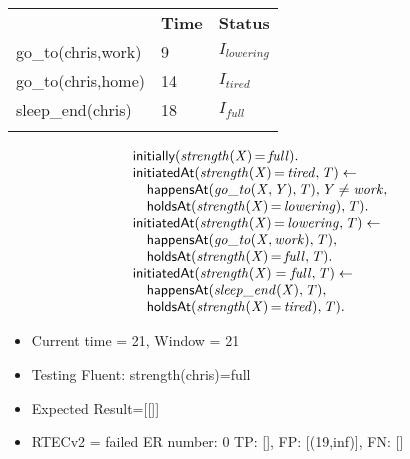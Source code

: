 \documentclass[8pt]{beamer}
\DeclareMathOperator{\val}{=}  %
\def \patsize {}
\def\happensAt{\textsf{\patsize happensAt}}
\def\initially{\textsf{\patsize initially}}
\def\holdsAt{\textsf{\patsize holdsAt}}
\def\initiatedAt{\textsf{\patsize initiatedAt}}
\newenvironment{mysplit}%
  {\arraycolsep 0pt \begin{array}{l}}%
  {\end{array}}
\begin{document}
\begin{frame}
\begin{minipage}{0.4\linewidth}
\begin{table}[t!]
\begin{center}
                \begin{tabular}{lll}
                    \hline\noalign{\smallskip}
                    \multicolumn{1}{l}{\textbf{Event}} & \multicolumn{1}{c}{\textbf{Time}} & \multicolumn{1}{c}{\textbf{Status}} \\
                    go\_to(chris,work)& 9 & $I_{lowering}$\\
                    go\_to(chris,home)& 14 & $I_{tired}$\\
                    sleep\_end(chris)& 18 & $I_{full}$\\
                    \noalign{\smallskip}
                    \hline
                \end{tabular}
            \end{center}
        \end{table}
    \end{minipage}
    \begin{minipage}{0.55\linewidth}
        \begin{align*}
            \begin{mysplit}
                \initially\mathit{(strength(X)\val full)}.\\
                \initiatedAt\mathit{(strength(X)\val tired,T)\leftarrow}\\
                \quad    \happensAt\mathit{(go\_to(X,Y),T),Y\neq work,}\\
                \quad    \holdsAt\mathit{(strength(X)\val lowering),T).}\\
                \initiatedAt\mathit{(strength(X)\val lowering,T)\leftarrow}\\
                \quad    \happensAt\mathit{(go\_to(X,work),T),}\\
                \quad    \holdsAt\mathit{(strength(X)\val full,T).}\\
                \initiatedAt\mathit{(strength(X)=full,T)\leftarrow}\\
                \quad    \happensAt\mathit{(sleep\_end(X),T),}\\
                \quad    \holdsAt\mathit{(strength(X)\val tired),T).}\\
            \end{mysplit}
        \end{align*}
    \end{minipage}
    \begin{itemize}
        \item Current time = 21, Window = 21
        \item Testing Fluent: strength(chris)=full
        \item Expected Result=[[]]
        \item RTECv2 = failed ER number: 0 TP: [], FP: [(19,inf)], FN: []
    \end{itemize}
\end{frame}
\end{document}
